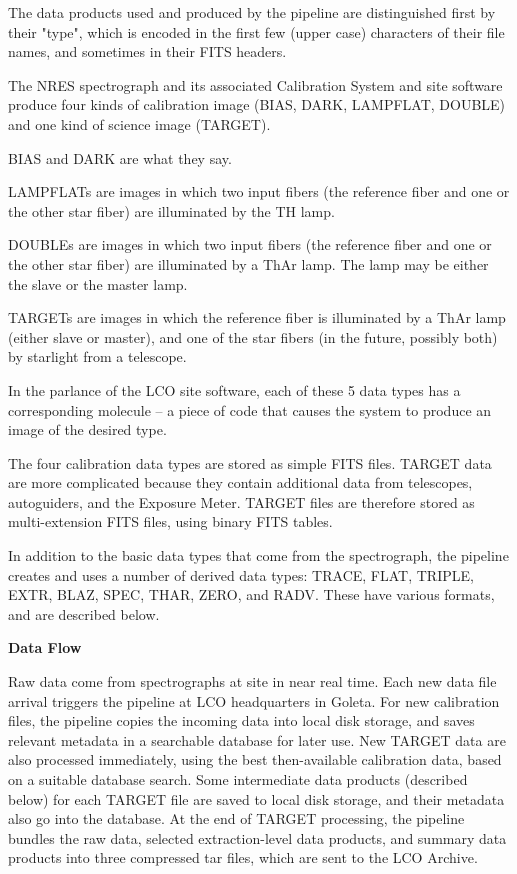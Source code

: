 The data products used and produced by the pipeline are distinguished first
by their "type", which is encoded in the first few (upper case) characters
of their file names, and sometimes in their FITS headers.

The NRES spectrograph and its associated Calibration System and 
site software produce four kinds
of calibration image (BIAS, DARK, LAMPFLAT, DOUBLE) and one kind of science
image (TARGET).  

BIAS and DARK are what they say.

LAMPFLATs are images in which two input fibers (the reference fiber and one
or the other star fiber) are illuminated by the TH lamp.

DOUBLEs are images in which two input fibers (the reference fiber and one
or the other star fiber) are illuminated by a ThAr lamp.  The lamp may
be either the slave or the master lamp.

TARGETs are images in which the reference fiber is illuminated by a ThAr
lamp (either slave or master), and one of the star fibers (in the future,
possibly both) by starlight from a telescope.

In the parlance of the LCO site software, each of these 5 data types has a
corresponding molecule --  a piece of code that causes the system to produce
an image of the desired type.

The four calibration data types are stored as simple FITS files.  
TARGET data are more complicated because they contain additional data from
telescopes, autoguiders, and the Exposure Meter.  TARGET files are therefore
stored as multi-extension FITS files, using binary FITS tables.

In addition to the basic data types that come from the spectrograph, the
pipeline creates and uses a number of derived data types: TRACE, FLAT, TRIPLE, 
EXTR, BLAZ, SPEC, THAR, ZERO, and RADV.  These have various formats, and are 
described below.

\vskip12pt
\parindent=0pt
{\bf{Data Flow}}
\vskip8pt
\parindent20pt

Raw data come from spectrographs at site in near real time.  Each new data
file arrival triggers the pipeline at LCO headquarters in Goleta.  For
new calibration files, the pipeline copies the incoming data into local
disk storage, and saves relevant metadata in a searchable database for later
use.  New TARGET data are also processed immediately, using the best
then-available calibration data, based on a suitable database search.
Some intermediate data products (described below) for each TARGET file are
saved to local disk storage, and their metadata also go into the database.
At the end of TARGET processing, the pipeline bundles the raw data,
selected extraction-level data products, and summary data products into three
compressed tar files, which are sent to the LCO Archive.

